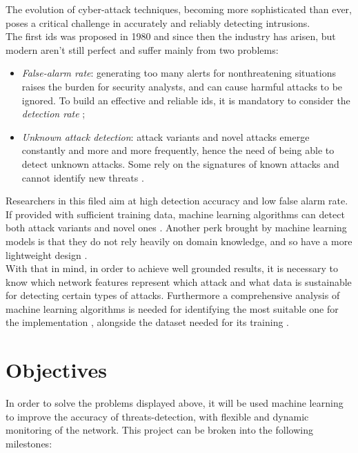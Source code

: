 The evolution of cyber-attack techniques, becoming more sophisticated than ever, poses a critical challenge in accurately and reliably detecting intrusions.\\ The first \gls{ids} was proposed in 1980 \cite{Andreson1980} and since then the industry has arisen, but modern  aren't still perfect and suffer mainly from two problems:
\begin{itemize}
    \item[\faCaretRight] \textit{False-alarm rate}: generating too many alerts for nonthreatening situations raises the burden for security analysts, and can cause harmful attacks to be ignored. To build an effective and reliable \gls{ids}, it is mandatory to consider the \textit{detection rate} \cite{Liu2019};
    \item[\faCaretRight] \textit{Unknown attack detection}: attack variants and novel attacks emerge constantly and more and more frequently, hence the need of being able to detect unknown attacks. Some  rely on the signatures of known attacks and cannot identify new threats \cite{Hodo2017}.
\end{itemize}
Researchers in this filed aim at high detection accuracy and low false alarm rate. \\
If provided with sufficient training data, machine learning algorithms can detect both attack variants and novel ones \cite{Hodo2017}. Another perk brought by machine learning models is that they do not rely heavily on domain knowledge, and so have a more lightweight design \cite{Khraisat2019}. \\ With that in mind, in order to achieve well grounded results, it is necessary to know which network features represent which attack \cite{Iglesias2015} and what data is sustainable for detecting certain types of attacks. Furthermore a comprehensive analysis of machine learning algorithms is needed for identifying the most suitable one for the implementation \cite{Liu2019}, alongside the dataset needed for its training \cite{Sharafaldin2019}.



\section{Objectives}
\label{sec:objectives}

In order to solve the problems displayed above, it will be used machine learning to improve the accuracy of threats-detection, with flexible and dynamic monitoring of the network. This project can be broken into the following milestones:

